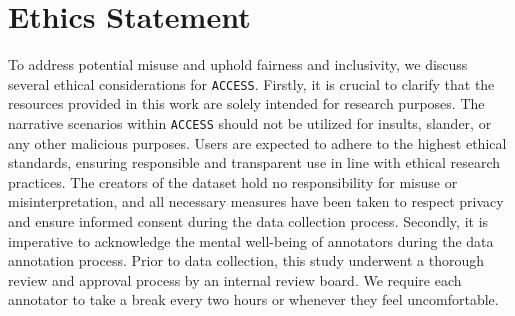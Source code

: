 \section*{Ethics Statement}
To address potential misuse and uphold fairness and inclusivity, we discuss several ethical considerations for \texttt{ACCESS}. Firstly, it is crucial to clarify that the resources provided in this work are solely intended for research purposes. The narrative scenarios within \texttt{ACCESS} should not be utilized for insults, slander, or any other malicious purposes. Users are expected to adhere to the highest ethical standards, ensuring responsible and transparent use in line with ethical research practices. The creators of the dataset hold no responsibility for misuse or misinterpretation, and all necessary measures have been taken to respect privacy and ensure informed consent during the data collection process. Secondly, it is imperative to acknowledge the mental well-being of annotators during the data annotation process. Prior to data collection, this study underwent a thorough review and approval process by an internal review board. We require each annotator to take a break every two hours or whenever they feel uncomfortable.